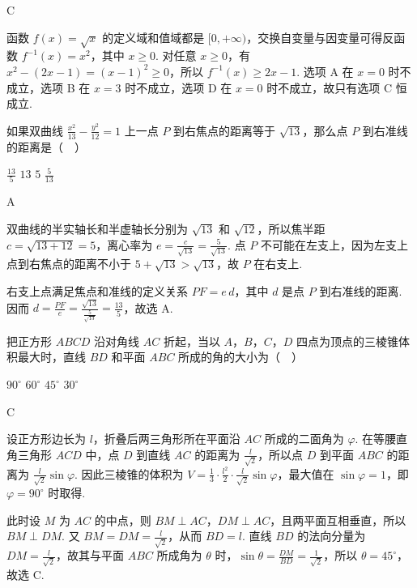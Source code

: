 \begin{answer}
C
\end{answer}

\begin{solution}
函数 \(f(x)=\sqrt{x}\) 的定义域和值域都是 \([0,+\infty)\)，交换自变量与因变量可得反函数 \(f^{-1}(x)=x^2\)，其中 \(x\geqslant0\). 对任意 \(x\geqslant0\)，有
\(x^2-(2x-1)=(x-1)^2\geqslant0\)，所以 \(f^{-1}(x)\geqslant2x-1\). 选项 A 在 \(x=0\) 时不成立，选项 B 在 \(x=3\) 时不成立，选项 D 在 \(x=0\) 时不成立，故只有选项 C 恒成立.
\end{solution}

\begin{problem}
如果双曲线 \(\frac{x^2}{13} - \frac{y^2}{12} = 1\) 上一点 \(P\) 到右焦点的距离等于 \(\sqrt{13}\)，那么点 \(P\) 到右准线的距离是（\(\quad\)）

\choices
    {\( \frac{13}{5} \)}
    {\(13\)}
    {\(5\)}
    {\( \frac{5}{13} \)}
\end{problem}

\begin{answer}
A
\end{answer}

\begin{solution}
双曲线的半实轴长和半虚轴长分别为 \(\sqrt{13}\) 和 \(\sqrt{12}\)，所以焦半距 \(c=\sqrt{13+12}=5\)，离心率为 \(e=\frac{c}{\sqrt{13}}=\frac{5}{\sqrt{13}}\). 点 \(P\) 不可能在左支上，因为左支上点到右焦点的距离不小于 \(5+\sqrt{13}>\sqrt{13}\)，故 \(P\) 在右支上.

右支上点满足焦点和准线的定义关系 \(PF=e\,d\)，其中 \(d\) 是点 \(P\) 到右准线的距离. 因而
\(d=\frac{PF}{e}=\frac{\sqrt{13}}{\frac{5}{\sqrt{13}}}=\frac{13}{5}\)，故选 A.
\end{solution}

\begin{problem}
把正方形 \(ABCD\) 沿对角线 \(AC\) 折起，当以 \(A\)，\(B\)，\(C\)，\(D\) 四点为顶点的三棱锥体积最大时，直线 \(BD\) 和平面 \(ABC\) 所成的角的大小为（\(\quad\)）

\choices
    {\(90^{\circ}\)}
    {\(60^{\circ}\)}
    {\(45^{\circ}\)}
    {\(30^{\circ}\)}
\end{problem}

\begin{answer}
C
\end{answer}

\begin{solution}
设正方形边长为 \(l\)，折叠后两三角形所在平面沿 \(AC\) 所成的二面角为 \(\varphi\). 在等腰直角三角形 \(ACD\) 中，点 \(D\) 到直线 \(AC\) 的距离为 \(\frac{l}{\sqrt{2}}\)，所以点 \(D\) 到平面 \(ABC\) 的距离为 \(\frac{l}{\sqrt{2}}\sin\varphi\). 因此三棱锥的体积为
\(V=\frac{1}{3}\cdot\frac{l^2}{2}\cdot\frac{l}{\sqrt{2}}\sin\varphi\)，最大值在 \(\sin\varphi=1\)，即 \(\varphi=90^{\circ}\) 时取得.

此时设 \(M\) 为 \(AC\) 的中点，则 \(BM\perp AC\)，\(DM\perp AC\)，且两平面互相垂直，所以 \(BM\perp DM\). 又 \(BM=DM=\frac{l}{\sqrt{2}}\)，从而 \(BD=l\). 直线 \(BD\) 的法向分量为 \(DM=\frac{l}{\sqrt{2}}\)，故其与平面 \(ABC\) 所成角为 \(\theta\) 时，\(\sin\theta=\frac{DM}{BD}=\frac{1}{\sqrt{2}}\)，所以 \(\theta=45^{\circ}\)，故选 C.
\end{solution}

